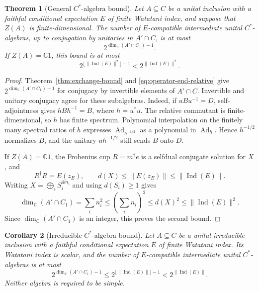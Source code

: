 \documentclass[11pt]{amsart}
\newtheorem{theorem}{Theorem}[section]
\newtheorem{corollary}[theorem]{Corollary}
\theoremstyle{definition}
\theoremstyle{remark}
\newcommand{\CC}{\mathbb C}
\begin{document}
\begin{theorem}[General $C^*$-algebra bound]
\label{thm:cstar-general-bound}
Let $A\subseteq C$ be a unital inclusion with a faithful conditional
expectation $E$ of finite Watatani index, and suppose that $Z(A)$ is
finite-dimensional.  The number of $E$-compatible intermediate unital
$C^*$-algebras, up to conjugation by unitaries in $A'\cap C$, is at most
\[
 2^{\dim_{\CC}(A'\cap C_1)-1}.
\]
If $Z(A)=\CC1$, this bound is at most
\[
 2^{\lfloor\|\operatorname{Ind}(E)\|^2\rfloor-1}
 <2^{\|\operatorname{Ind}(E)\|^2}.
\]
\end{theorem}

\begin{proof}
Theorem~\ref{thm:exchange-bound} and
\eqref{eq:operator-end-relative} give $2^{\dim_{\CC}(A'\cap C_1)-1}$ for conjugacy by
invertible elements of $A'\cap C$.
Invertible and unitary conjugacy agree for these subalgebras.  Indeed,
if $uBu^{-1}=D$, self-adjointness gives $hBh^{-1}=B$, where $h=u^*u$.
The relative commutant is finite-dimensional, so $h$ has finite spectrum.
Polynomial interpolation on the finitely many spectral ratios of $h$
expresses $\operatorname{Ad}_{h^{-1/2}}$ as a polynomial in
$\operatorname{Ad}_h$.  Hence $h^{-1/2}$ normalizes $B$, and the unitary
$uh^{-1/2}$ still sends $B$ onto $D$.

If $Z(A)=\CC1$, the Frobenius cup $R=m^\dagger e$ is a selfdual
conjugate solution for $X$, and
\begin{equation}\label{eq:operator-dimension-index-upper}
 R^\dagger R=E(z_E),\qquad
 d(X)\leq\|E(z_E)\|\leq\|\operatorname{Ind}(E)\|.
\end{equation}
Writing $X=\bigoplus_iS_i^{\oplus n_i}$ and using $d(S_i)\geq1$ gives
\[
 \dim_{\CC}(A'\cap C_1)=\sum_i n_i^2\leq\left(\sum_i n_i\right)^2
 \leq d(X)^2\leq\|\operatorname{Ind}(E)\|^2.
\]
Since $\dim_{\CC}(A'\cap C_1)$ is an integer, this proves the second bound.
\end{proof}

\begin{corollary}[Irreducible $C^*$-algebra bound]
\label{cor:cstar-irreducible-bound}
Let $A\subseteq C$ be a unital irreducible inclusion with a faithful
conditional expectation $E$ of finite Watatani index.  Its Watatani
index is scalar, and the number of $E$-compatible intermediate unital
$C^*$-algebras is at most
\[
 2^{\dim_{\CC}(A'\cap C_1)-1}
 \leq 2^{\lfloor\|\operatorname{Ind}(E)\|\rfloor-1}
 <2^{\|\operatorname{Ind}(E)\|}.
\]
Neither algebra is required to be simple.
\end{corollary}
\end{document}
